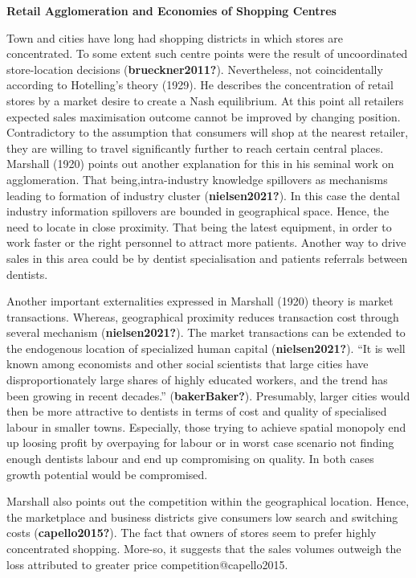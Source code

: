 \documentclass[
  10,
  a4paper,
]{article}
\begin{document}
\textbf{Retail Agglomeration and Economies of Shopping Centres}

Town and cities have long had shopping districts in which stores are
concentrated. To some extent such centre points were the result of
uncoordinated store-location decisions (\textbf{brueckner2011?}).
Nevertheless, not coincidentally according to Hotelling's theory (1929).
He describes the concentration of retail stores by a market desire to
create a Nash equilibrium. At this point all retailers expected sales
maximisation outcome cannot be improved by changing position.
Contradictory to the assumption that consumers will shop at the nearest
retailer, they are willing to travel significantly further to reach
certain central places. Marshall (1920) points out another explanation
for this in his seminal work on agglomeration. That being,intra-industry
knowledge spillovers as mechanisms leading to formation of industry
cluster (\textbf{nielsen2021?}). In this case the dental industry
information spillovers are bounded in geographical space. Hence, the
need to locate in close proximity. That being the latest equipment, in
order to work faster or the right personnel to attract more patients.
Another way to drive sales in this area could be by dentist
specialisation and patients referrals between dentists.

Another important externalities expressed in Marshall (1920) theory is
market transactions. Whereas, geographical proximity reduces transaction
cost through several mechanism (\textbf{nielsen2021?}). The market
transactions can be extended to the endogenous location of specialized
human capital (\textbf{nielsen2021?}). ``It is well known among
economists and other social scientists that large cities have
disproportionately large shares of highly educated workers, and the
trend has been growing in recent decades.'' (\textbf{bakerBaker?}).
Presumably, larger cities would then be more attractive to dentists in
terms of cost and quality of specialised labour in smaller towns.
Especially, those trying to achieve spatial monopoly end up loosing
profit by overpaying for labour or in worst case scenario not finding
enough dentists labour and end up compromising on quality. In both cases
growth potential would be compromised.

Marshall also points out the competition within the geographical
location. Hence, the marketplace and business districts give consumers
low search and switching costs (\textbf{capello2015?}). The fact that
owners of stores seem to prefer highly concentrated shopping. More-so,
it suggests that the sales volumes outweigh the loss attributed to
greater price competition@capello2015.
\end{document}

